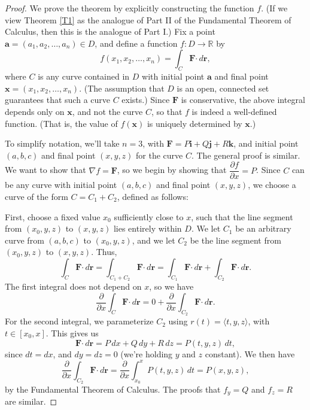 \documentclass[12pt,letterpaper]{article}
\newcommand{\dotp}{\boldsymbol{\cdot}}
\newcommand{\R}{\mathbb{R}}
\renewcommand{\r}{\mathbf{r}}
\newcommand{\F}{\mathbf{F}}
\renewcommand{\i}{\mathbf{i}}
\renewcommand{\j}{\mathbf{j}}
\renewcommand{\k}{\mathbf{k}}
\begin{document}
\begin{proof}
 We prove the theorem by explicitly constructing the function $f$. (If we view Theorem \ref{T1} as the analogue of Part II of the Fundamental Theorem of Calculus, then this is the analogue of Part I.) Fix a point $\mathbf{a}=(a_1,a_2,\ldots, a_n)\in D$, and define a function $f:D\to\R$ by
\[
 f(x_1,x_2,\ldots, x_n) = \int_C \F\dotp \,d\r,
\]
where $C$ is any curve contained in $D$ with initial point $\mathbf{a}$ and final point $\mathbf{x}=(x_1,x_2,\ldots, x_n)$. (The assumption that $D$ is an open, connected set guarantees that such a curve $C$ exists.) Since $\F$ is conservative, the above integral depends only on $\mathbf{x}$, and not the curve $C$, so that $f$ is indeed a well-defined function. (That is, the value of $f(\mathbf{x})$ is uniquely determined by $\mathbf{x}$.)

To simplify notation, we'll take $n=3$, with $\F=P\i+Q\j+R\k$, and initial point $(a,b,c)$ and final point $(x,y,z)$ for the curve $C$. The general proof is similar.
We want to show that $\nabla f = \F$, so we begin by showing that $\dfrac{\partial f}{\partial x} = P$. Since $C$ can be any curve with initial point $(a,b,c)$ and final point $(x,y,z)$, we choose a curve of the form $C=C_1+C_2$, defined as follows:

First, choose a fixed value $x_0$ sufficiently close to $x$, such that the line segment from $(x_0,y,z)$ to $(x,y,z)$ lies entirely within $D$. We let $C_1$ be an arbitrary curve from $(a,b,c)$ to $(x_0,y,z)$, and we let $C_2$ be the line segment from $(x_0,y,z)$ to $(x,y,z)$. Thus,
\[
 \int_C\F\dotp\,d\r = \int_{C_1+C_2}\F\dotp\,d\r = \int_{C_1}\F\dotp\,d\r +\int_{C_2}\F\dotp\,d\r .
\]
The first integral does not depend on $x$, so we have
\[
 \frac{\partial}{\partial x}\int_C\F\dotp\,d\r = 0+\frac{\partial}{\partial x}\int_{C_2}\F\dotp\,d\r. 
\]
For the second integral, we parameterize $C_2$ using $r(t) = \langle t, y, z\rangle$, with $t\in [x_0,x]$. This gives us
\[
 \F\dotp\,d\r = P\,dx+Q\,dy+R\,dz  = P(t,y,z)\,dt,
\]
since $dt = dx$, and $dy=dz=0$ (we're holding $y$ and $z$ constant). We then have
\[
 \frac{\partial}{\partial x}\int_{C_2}\F\dotp\,d\r = \frac{\partial }{\partial x}\int_{x_0}^x P(t,y,z)\,dt = P(x,y,z),
\]
by the Fundamental Theorem of Calculus. The proofs that $f_y=Q$ and $f_z=R$ are similar.
\end{proof}
\end{document}
